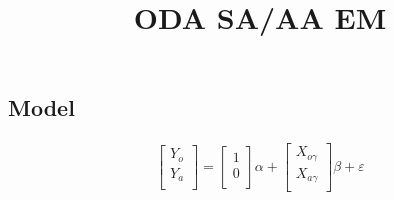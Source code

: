 \documentclass[9pt]{article}
\begin{document}
\vspace{-1in}
\title{\bf ODA SA/AA EM}
\maketitle \centerline{{\color{RoyalBlue2}{Michael Lindon}}}\bigskip
\subsection*{Model}
\begin{align}
	\begin{bmatrix}
		Y_{o}\\
		Y_{a}\\
	\end{bmatrix}=
	\begin{bmatrix}
		1\\
		0\\
	\end{bmatrix}\alpha+\begin{bmatrix}
		X_{o\gamma}\\
		X_{a\gamma}\\
	\end{bmatrix}\beta+\varepsilon
	\label{}
\end{align}
\end{document}

